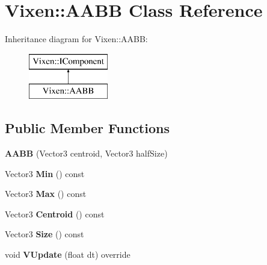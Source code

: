 \hypertarget{class_vixen_1_1_a_a_b_b}{}\section{Vixen\+:\+:A\+A\+B\+B Class Reference}
\label{class_vixen_1_1_a_a_b_b}
Inheritance diagram for Vixen\+:\+:A\+A\+B\+B\+:\begin{figure}[H]
\begin{center}
\leavevmode
\includegraphics[height=2.000000cm]{class_vixen_1_1_a_a_b_b}
\end{center}
\end{figure}
\subsection*{Public Member Functions}
\begin{DoxyCompactItemize}
\item 
\hypertarget{class_vixen_1_1_a_a_b_b_abc2401581531a33e2b9b87a7154ba6cd}{}{\bfseries A\+A\+B\+B} (Vector3 centroid, Vector3 half\+Size)\label{class_vixen_1_1_a_a_b_b_abc2401581531a33e2b9b87a7154ba6cd}

\item 
\hypertarget{class_vixen_1_1_a_a_b_b_a6165483dc6afbe401e8a149b27f79b92}{}Vector3 {\bfseries Min} () const \label{class_vixen_1_1_a_a_b_b_a6165483dc6afbe401e8a149b27f79b92}

\item 
\hypertarget{class_vixen_1_1_a_a_b_b_a7a435efb132f146c28cc1198cb97b094}{}Vector3 {\bfseries Max} () const \label{class_vixen_1_1_a_a_b_b_a7a435efb132f146c28cc1198cb97b094}

\item 
\hypertarget{class_vixen_1_1_a_a_b_b_a5866b634a45f8d934c4984aa3f3bc2be}{}Vector3 {\bfseries Centroid} () const \label{class_vixen_1_1_a_a_b_b_a5866b634a45f8d934c4984aa3f3bc2be}

\item 
\hypertarget{class_vixen_1_1_a_a_b_b_a782be98a3f4e31b301835b03dfb87947}{}Vector3 {\bfseries Size} () const \label{class_vixen_1_1_a_a_b_b_a782be98a3f4e31b301835b03dfb87947}

\item 
\hypertarget{class_vixen_1_1_a_a_b_b_a5cf373844ae95e26908072853a9e0e59}{}void {\bfseries V\+Update} (float dt) override\label{class_vixen_1_1_a_a_b_b_a5cf373844ae95e26908072853a9e0e59}

\end{DoxyCompactItemize}
